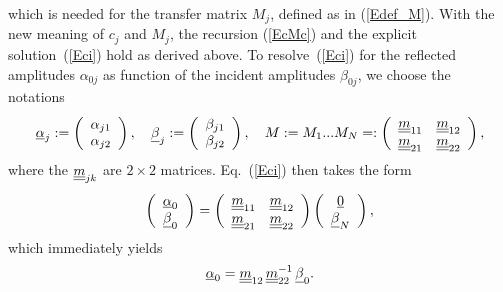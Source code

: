which is needed for the transfer matrix $M_j$,
defined as in (\ref{Edef_M}).
With the new meaning of $c_j$ and $M_j$,
the recursion (\ref{EcMc}) and the explicit solution~(\ref{Eci})
hold as derived above.
To resolve~(\ref{Eci}) for the reflected amplitudes $\alpha_{0j}$
as function of the incident amplitudes $\beta_{0j}$,
we choose the notations
\begin{equation}
  \u\alpha_j
  :=\left(\begin{array}{c}\alpha_{j1}\\\alpha_{j2}\end{array}\right),\quad
  \u\beta_j
  :=\left(\begin{array}{c}\beta_{j1}\\\beta_{j2}\end{array}\right),\quad
  M:=M_1 ... M_N %
  =:\left(\begin{array}{cc}\uu m_{11}&\uu m_{12}\\
                           \uu m_{21}&\uu m_{22}\end{array}\right),
\end{equation}
where the $\underline{\underline{m}}_{jk}$ are $2\times2$ matrices.
Eq.~(\ref{Eci}) then takes the form
\begin{equation}
  \left(\begin{array}{c}\underline{\alpha}_{0}\\\underline{\beta}_{0}\end{array}\right)
  = 
  \left(\begin{array}{cc}\underline{\underline{m}}_{11}&\underline{\underline{m}}_{12}\\
    \underline{\underline{m}}_{21}&\underline{\underline{m}}_{22}\end{array}\right)
  \left(\begin{array}{c}\underline{0}\\\underline{\beta}_{N}\end{array}\right),
\end{equation}
which immediately yields
\begin{equation}
  \underline{\alpha}_0 = \underline{\underline{m}}_{12}\,\underline{\underline{m}}_{22}^{-1}\,\underline{\beta}_0.
\end{equation}

%
